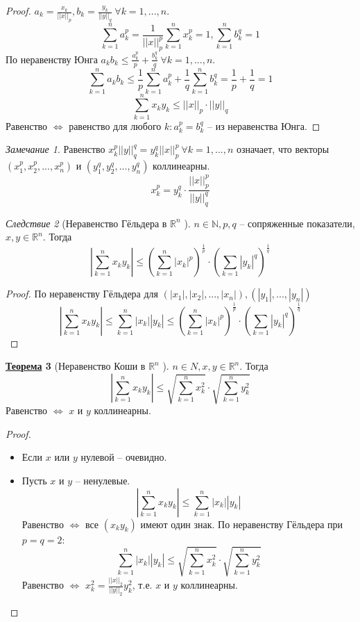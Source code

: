 \documentclass[12pt]{article}
\newenvironment{MyItemize}[1][4pt]{
  \begin{itemize}
  \setlength{\parskip}{0pt}
  \setlength{\itemsep}{#1}
}{       
  \end{itemize}
}
\def\N{\mathbb{N}}       %
\def\R{\mathbb{R}}       %
\def\EQ{\Leftrightarrow} %
\theoremstyle{definition} %
\newtheorem{Thm}{\underline{Теорема}}[subsection] %
\theoremstyle{plain} %
\theoremstyle{remark} %
\newtheorem{Cons}[Thm]{Следствие} %
\newtheorem{Rem}[Thm]{Замечание} %
\begin{document}
\begin{proof}
    $a_k = \frac{x_k}{||x||_p}, b_k = \frac{y_k}{||y||_q} \ \forall k = 1, ..., n$.
    \[\sum_{k = 1}^n a_k^p = \frac{1}{||x||_p^p} \sum_{k = 1}^n x_k^p = 1, \sum_{k = 1}^n b_k^q = 1\]
    По неравенству Юнга $a_k b_k \leqslant \frac{a_k^{p}}{p} + \frac{b_k^q}{q} \ \forall k = 1, ..., n$.
    \[\sum_{k = 1}^n a_kb_k \leqslant \frac{1}{p}\sum_{k = 1}^n a_k^p + \frac{1}{q} \sum_{k = 1}^n b_k^q = \frac{1}{p} + \frac{1}{q} = 1\]  
    \[\sum_{k = 1}^n x_k y_k \leqslant ||x||_p \cdot ||y||_q\]
    Равенство $\EQ$ равенство для любого $k : a_k^p = b_k^q$ -- из неравенства Юнга. 
\end{proof}

\begin{Rem}
    Равенство $x_k^p ||y||_q^q = y_k^q ||x||_p^p \ \forall k = 1, ..., n$ означает, что 
    векторы $(x_1^p, x_2^p, ..., x_n^p)$ и $(y_1^q, y_2^q, ..., y_n^q)$ коллинеарны.  
    \[x_k^{p} = y_k^{q} \cdot \frac{||x||_p^p}{||y||_q^q}\]
\end{Rem} 

\begin{Cons}[Неравенство Гёльдера в $\R^n$ ]
    $n \in \N, p, q$ -- сопряженные показатели, $x, y \in \R^n$. Тогда
    \[\left|\sum_{k = 1}^n x_ky_k\right| \leqslant \left(\sum_{k = 1}^n |x_k|^p\right)^{\frac{1}{p}} \cdot \left(\sum_{k = 1}|y_k|^q\right)^{\frac{1}{q}}\]
\end{Cons}

\begin{proof}
    По неравенству Гёльдера для $(|x_1|, |x_2|, ..., |x_n|), (|y_1|, ..., |y_n|)$ 
    \[\left|\sum_{k = 1}^n x_k y_k\right| \leqslant \sum_{k = 1}^n |x_k||y_k| \leqslant \left(\sum_{k = 1}^n |x_k|^p\right)^{\frac{1}{p}} \cdot \left(\sum_{k = 1}|y_k|^q\right)^{\frac{1}{q}}\]
\end{proof}

\begin{Thm}[Неравенство Коши в $\R^n$ ]
    $n \in N, x, y \in \R^n$. Тогда 
    \[\left|\sum_{k = 1}^n x_ky_k\right| \leqslant \sqrt{\sum_{k = 1}^n x_k^2} \cdot \sqrt{\sum_{k = 1}^n y_k^2}\] 
    Равенство $\EQ$ $x$ и $y$ коллинеарны.
\end{Thm}

\begin{proof}
    \begin{MyItemize}
        \item Если $x$ или $y$ нулевой -- очевидно.
        \item Пусть $x$ и $y$ -- ненулевые.
        \[\left|\sum_{k = 1}^n x_k y_k\right| \leqslant \sum_{k = 1}^n |x_k| |y_k|\]
        Равенство $\EQ$ все $(x_k y_k)$ имеют один знак.
        По неравенству Гёльдера при $p = q = 2$:
        \[\sum_{k = 1}^n |x_k||y_k| \leqslant \sqrt{\sum_{k = 1}^n x_k^2} \cdot \sqrt{\sum_{k = 1}^n y_k^2}\]
        Равенство $\EQ$ $x_k^2 = \frac{||x||_2}{||y||_2} y_k^2$, т.е. $x$ и $y$ коллинеарны.
    \end{MyItemize}
\end{proof}
\end{document}
